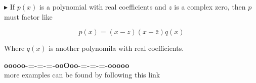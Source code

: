 \documentclass{ximera}
\begin{document}
\textbf{\textcolor{red!90!darkgray}{$\blacktriangleright$}}   If $p(x)$ is a polynomial with real coefficients and $z$ is a complex zero, then $p$ must factor like


\[ p(x) = (x-z) (x-\bar{z}) q(x)    \]

Where $q(x)$ is another polynomila with real coefficients.










\begin{center}
\textbf{\textcolor{green!50!black}{ooooo-=-=-=-ooOoo-=-=-=-ooooo}} \\

more examples can be found by following this link\\ 

\end{center}
\end{document}
